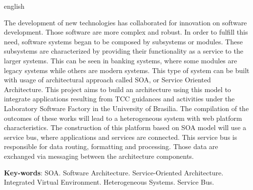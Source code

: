 \begin{resumo}[Abstract]
 \begin{otherlanguage*}{english}

	The development of new technologies has collaborated for innovation on software development. Those software are more complex and robust. In order to fulfill this need, software systems began to be composed by subsystems or modules. These subsystems are characterized by providing their functionality as a service to the larger systems. This can be seen in banking systems, where some modules are legacy systems while others are modern systems. This type of system can be built with usage of architectural approach called SOA, or Service Oriented Architecture. This project aims to build an architecture using this model to integrate applications resulting from TCC guidances and activities under the Laboratory Software Factory in the University of Brasilia. The compilation of the outcomes of these works will lead to a heterogeneous system with web platform characteristics. The construction of this platform based on SOA model will use a service bus, where applications and services are connected. This service bus is responsible for data routing, formatting and processing. Those data are exchanged via messaging between the architecture components.

   \vspace{\onelineskip}
 
   \noindent 
   \textbf{Key-words}: SOA. Software Architecture. Service-Oriented Architecture. Integrated Virtual Environment. Heterogeneous Systems. Service Bus.
 \end{otherlanguage*}
\end{resumo}

